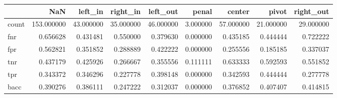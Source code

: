 \begin{tabular}{lrrrrrrrr}
\toprule
{} &         NaN &    left\_in &   right\_in &   left\_out &     penal &     center &      pivot &  right\_out \\
\midrule
count &  153.000000 &  43.000000 &  35.000000 &  46.000000 &  3.000000 &  57.000000 &  21.000000 &  29.000000 \\
fnr   &    0.656628 &   0.431481 &   0.550000 &   0.379630 &  0.000000 &   0.435185 &   0.444444 &   0.722222 \\
fpr   &    0.562821 &   0.351852 &   0.288889 &   0.422222 &  0.000000 &   0.255556 &   0.185185 &   0.337037 \\
tnr   &    0.437179 &   0.425926 &   0.266667 &   0.355556 &  0.111111 &   0.633333 &   0.592593 &   0.551852 \\
tpr   &    0.343372 &   0.346296 &   0.227778 &   0.398148 &  0.000000 &   0.342593 &   0.444444 &   0.277778 \\
bacc  &    0.390276 &   0.386111 &   0.247222 &   0.312037 &  0.000000 &   0.376852 &   0.407407 &   0.414815 \\
\bottomrule
\end{tabular}

